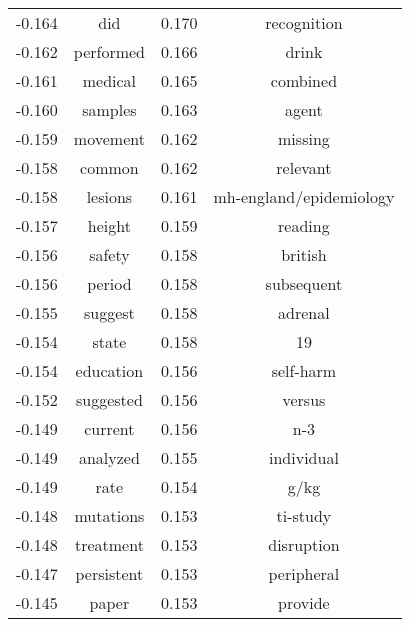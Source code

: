 \documentclass[paper=a4, fontsize=11pt]{scrartcl} %
\numberwithin{equation}{section} %
\numberwithin{figure}{section} %
\numberwithin{table}{section} %
\begin{document}
\begin{table}
\begin{tabular}{l c | l c}
-0.164 & did & 0.170 & recognition \\
-0.162 & performed & 0.166 & drink \\
-0.161 & medical & 0.165 & combined \\
-0.160 & samples & 0.163 & agent \\
-0.159 & movement & 0.162 & missing \\
-0.158 & common & 0.162 & relevant \\
-0.158 & lesions & 0.161 & mh-england/epidemiology \\
-0.157 & height & 0.159 & reading \\
-0.156 & safety & 0.158 & british \\
-0.156 & period & 0.158 & subsequent \\
-0.155 & suggest & 0.158 & adrenal \\
-0.154 & state & 0.158 & 19 \\
-0.154 & education & 0.156 & self-harm \\
-0.152 & suggested & 0.156 & versus \\
-0.149 & current & 0.156 & n-3 \\
-0.149 & analyzed & 0.155 & individual \\
-0.149 & rate & 0.154 & g/kg \\
-0.148 & mutations & 0.153 & ti-study \\
-0.148 & treatment & 0.153 & disruption \\
-0.147 & persistent & 0.153 & peripheral \\
-0.145 & paper & 0.153 & provide \\
\end{tabular}
\end{table}
\end{document}
